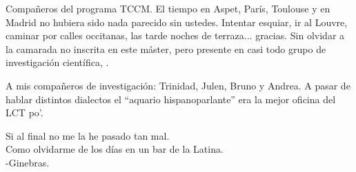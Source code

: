 {Compañeros del programa TCCM. El tiempo en Aspet, París, Toulouse y
en Madrid no hubiera sido nada parecido sin ustedes. Intentar esquiar, ir al
Louvre, caminar por calles occitanas, las tarde noches de terraza... gracias.
Sin olvidar a la camarada no inscrita en este máster, pero presente en
casi todo grupo de investigación científica,
.


A mis compañeros de investigación: Trinidad, Julen, Bruno y Andrea. A pasar de hablar
distintos dialectos el ``aquario hispanoparlante'' era la mejor oficina
del LCT po'. 

\begin{flushright}
Si al final no me la he pasado tan mal.\\
Como olvidarme de los días en un bar de la Latina.\\
-Ginebras.
\end{flushright}

}

\vspace*{\fill}

